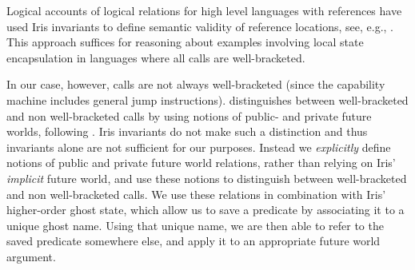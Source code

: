 \documentclass[sigplan,review]{acmart}\settopmatter{printfolios=true,printccs=false,printacmref=false}
\begin{document}




Logical accounts of logical relations for high level languages with references have used Iris invariants to define semantic validity of reference locations, see, e.g., \cite{ipm}.
This approach suffices for reasoning about examples involving local state encapsulation in languages where all calls are well-bracketed.

In our case, however, calls are not always well-bracketed (since the capability machine includes general jump instructions).
\citeauthor{skorstengaardESOP18} \cite{skorstengaardESOP18} distinguishes between well-bracketed and non well-bracketed calls by using notions of public- and private future worlds, following \cite{dreyer_neis_birkedal_2012}.
Iris invariants do not make such a distinction and thus invariants alone are not sufficient for our purposes.
Instead we \textit{explicitly} define notions of public and private future world relations, rather than relying on Iris' \textit{implicit} future world, and use these notions to distinguish between well-bracketed and non well-bracketed calls.
We use these relations in combination with Iris' higher-order ghost state, which allow us to save a predicate by associating it to a unique ghost name.
Using that unique name, we are then able to refer to the saved predicate somewhere else, and apply it to
an appropriate future world argument.
\end{document}
